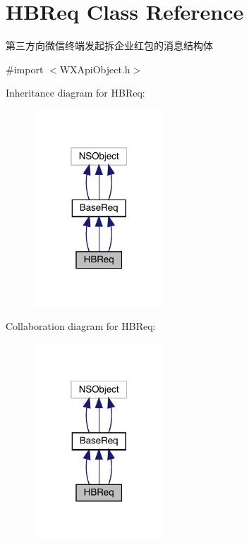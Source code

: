 \hypertarget{interface_h_b_req}{}\section{H\+B\+Req Class Reference}
\label{interface_h_b_req}


第三方向微信终端发起拆企业红包的消息结构体  




{\ttfamily \#import $<$W\+X\+Api\+Object.\+h$>$}



Inheritance diagram for H\+B\+Req\+:\nopagebreak
\begin{figure}[H]
\begin{center}
\leavevmode
\includegraphics[width=139pt]{interface_h_b_req__inherit__graph}
\end{center}
\end{figure}


Collaboration diagram for H\+B\+Req\+:\nopagebreak
\begin{figure}[H]
\begin{center}
\leavevmode
\includegraphics[width=139pt]{interface_h_b_req__coll__graph}
\end{center}
\end{figure}
